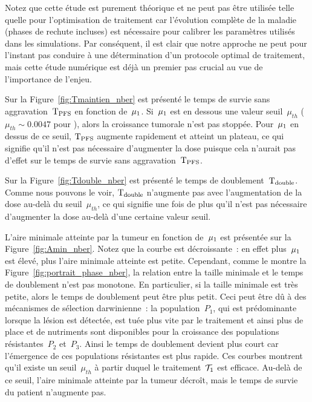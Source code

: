\documentclass[main.tex]{subfiles}
\begin{document}
Notez que cette étude est purement théorique et ne peut pas être utilisée telle quelle pour l'optimisation de traitement car l'évolution complète de la maladie (phases de rechute incluses) est nécessaire pour calibrer les paramètres utilisés dans les simulations. Par conséquent, il est clair que notre approche ne peut pour l'instant pas conduire à une détermination d'un protocole optimal de traitement, mais cette étude numérique est déjà un premier pas crucial au vue de l'importance de l'enjeu.


Sur la Figure~\ref{fig:Tmaintien_nber} est présenté le temps de survie sans aggravation~${\rm T_{PFS}}$ en fonction de~$\mu_1$. 
Si~$\mu_1$ est en dessous une valeur seuil~$\mu_{th}$ ($\mu_{th}\sim 0.0047$ pour \Nber), alors la croissance tumorale n'est pas stoppée.  
Pour~$\mu_1$ en dessus de ce seuil, ${\rm T_{PFS}}$ augmente rapidement et atteint un plateau, ce qui signifie qu'il n'est pas nécessaire d'augmenter la dose puisque cela n'aurait pas d'effet sur  le temps de survie sans aggravation~${\rm T_{PFS}}$.

Sur la Figure~\ref{fig:Tdouble_nber} est présenté le temps de doublement~${\rm T_{double}}$. 
Comme nous pouvons le voir, ${\rm T_{double}}$ n'augmente pas avec l'augmentation de la dose au-delà du seuil~$\mu_{th}$, ce qui signifie une fois de plus qu'il n'est pas nécessaire d'augmenter la dose au-delà d'une certaine valeur seuil.


L'aire minimale atteinte par la tumeur en fonction de~$\mu_1$ est présentée sur la Figure~\ref{fig:Amin_nber}. Notez que la courbe est décroissante~: en effet plus~$\mu_1$ est élevé, plus l'aire minimale atteinte est petite. Cependant, comme le montre la  Figure~\ref{fig:portrait_phase_nber}, la relation entre la taille minimale et le temps de doublement n'est pas monotone. En particulier, si la taille minimale est très petite, alors le temps de doublement peut être plus petit.  
Ceci peut être dû à des mécanismes de sélection darwinienne~: 
la population~$P_1$, qui est prédominante lorsque la lésion est détectée, est tuée plus vite par le traitement et ainsi plus de place et de nutriments sont disponibles pour la croissance des populations résistantes~$P_2$ et~$P_3$. Ainsi le temps de doublement devient plus court car l'émergence de ces populations résistantes est plus rapide. 
Ces courbes montrent qu'il existe un seuil~$\mu_{th}$ à partir duquel le traitement~$\mathcal{T}_1$ est efficace. Au-delà de ce seuil, l'aire minimale atteinte par la tumeur décroît, mais le temps de survie du patient n'augmente pas.
\end{document}
